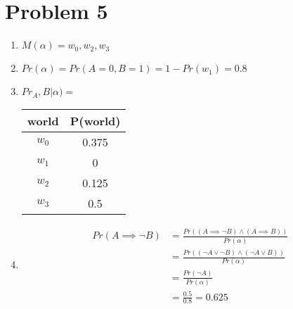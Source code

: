 \documentclass{article}
\begin{document}
\section*{Problem 5}
\begin{enumerate} [label=(\alph*)]
\item
	$M(\alpha) = {w_0, w_2, w_3}$
\item
	$Pr(\alpha) = Pr(A=0, B=1) = 1 - Pr(w_1) = 0.8$
\item
	$Pr_A, B | \alpha) =$
	\begin{tabular} {c | c}
		world & P(world) \\ \hline
		$w_0$ & 0.375 \\
		$w_1$ & 0 \\
		$w_2$ & 0.125 \\
		$w_3$ & 0.5 \\
	\end{tabular}
\item \begin{align*}
	Pr(A \implies \neg B) &= \frac {Pr((A \implies \neg B) \land (A \implies B))} {Pr(\alpha)} \\
		&= \frac {Pr((\neg A \lor \neg B) \land (\neg A \lor B))} {Pr(\alpha)} \\
		&= \frac {Pr(\neg A)} {Pr(\alpha)} \\
		&= \frac {0.5} {0.8} = 0.625
	\end{align*}
\end{enumerate}
\end{document}
